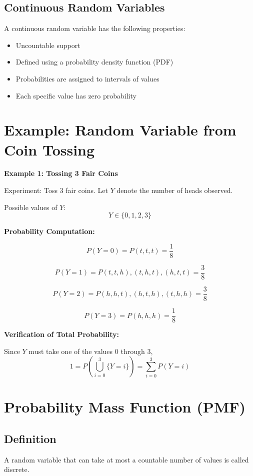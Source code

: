 \documentclass[12pt]{article}
\begin{document}
\subsection{Continuous Random Variables}

A continuous random variable has the following properties:
\begin{itemize}
    \item Uncountable support
    \item Defined using a probability density function (PDF)
    \item Probabilities are assigned to intervals of values
    \item Each specific value has zero probability
\end{itemize}

\section{Example: Random Variable from Coin Tossing}

\textbf{Example 1: Tossing 3 Fair Coins}

Experiment: Toss 3 fair coins.  
Let $Y$ denote the number of heads observed.

Possible values of $Y$:
\[
Y \in \{0,1,2,3\}
\]

\textbf{Probability Computation:}

\[
P(Y=0) = P(t,t,t) = \frac{1}{8}
\]

\[
P(Y=1) = P(t,t,h),(t,h,t),(h,t,t) = \frac{3}{8}
\]

\[
P(Y=2) = P(h,h,t),(h,t,h),(t,h,h) = \frac{3}{8}
\]

\[
P(Y=3) = P(h,h,h) = \frac{1}{8}
\]

\textbf{Verification of Total Probability:}

Since $Y$ must take one of the values $0$ through $3$,
\[
1 = P\left( \bigcup_{i=0}^{3} \{Y=i\} \right)
= \sum_{i=0}^{3} P(Y=i)
\]

\section{Probability Mass Function (PMF)}

\subsection{Definition}

A random variable that can take at most a countable number of values is called discrete.
\end{document}
